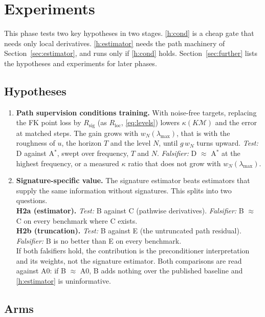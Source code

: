 \documentclass[english]{article}
\begin{document}
\section{Experiments}
This phase tests two key hypotheses in two stages. \ref{h:cond} is a cheap gate that needs only local derivatives. \ref{h:estimator} needs the path machinery of Section~\ref{sec:estimator}, and runs only if \ref{h:cond} holds. Section~\ref{sec:further} lists the hypotheses and experiments for later phases.

\subsection{Hypotheses}
\begin{enumerate}[label=\textbf{H\arabic*}, ref=H\arabic*, leftmargin=*]
  \item\label{h:cond} \textbf{Path supervision conditions training.} With noise-free targets, replacing the FK point loss by $R_\mathrm{sig}$ (as $R_\mathrm{loc}$, \eqref{eq:levels}) lowers $\kappa(K\mathcal M)$ and the error at matched steps. The gain grows with $w_N(\lambda_{\max})$, that is with the roughness of $u$, the horizon $T$ and  the level $N$, until $g\,w_N$ turns upward. \emph{Test:} D against A$^*$, swept over frequency, $T$ and $N$. \emph{Falsifier:} D $\approx$ A$^*$ at the highest frequency, or a measured $\kappa$ ratio that does not grow with $w_N(\lambda_{\max})$.
  \item\label{h:estimator} \textbf{Signature-specific value.} The signature estimator beats estimators that supply the same information without signatures. This splits into two questions.\\
  \textbf{H2a (estimator).} \emph{Test:} B against C (pathwise derivatives). \emph{Falsifier:} B $\approx$ C on every benchmark where C exists.\\
  \textbf{H2b (truncation).} \emph{Test:} B against E (the untruncated path residual). \emph{Falsifier:} B is no better than E on every benchmark.\\
  If both falsifiers hold, the contribution is the preconditioner interpretation and its weights, not the signature estimator. Both comparisons are read against A0: if B $\approx$ A0, B adds nothing over the published baseline and \ref{h:estimator} is uninformative.
\end{enumerate}

\subsection{Arms}
\end{document}
